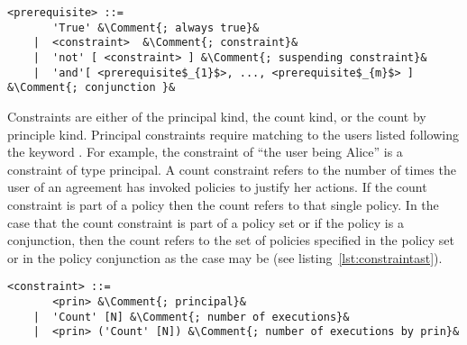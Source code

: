 
\lstset{mathescape, language=AST, escapechar=\&}  
\begin{lstlisting}[frame=single, caption={prerequisite},label={lst:preRequisiteast}]
<prerequisite> ::=  
       'True' &\Comment{; always true}&
    |  <constraint>	 &\Comment{; constraint}&
    |  'not' [ <constraint> ] &\Comment{; suspending constraint}&
    |  'and'[ <prerequisite$_{1}$>, ..., <prerequisite$_{m}$> ] &\Comment{; conjunction }&
\end{lstlisting}

Constraints are either of the principal kind, the count kind, or the count by principle kind. Principal constraints require matching to the users listed following the keyword . For example, the constraint of ``the user being Alice'' is a constraint of type principal. A count constraint refers to the number of times the user of an agreement has invoked policies to justify her actions. If the count constraint is part of a policy then the count refers to that single policy. In the case that the count constraint is part of a policy set or if the policy is a conjunction, then the count refers to the set of policies specified in the policy set or in the policy conjunction as the case may be (see listing~\ref{lst:constraintast}).

\lstset{mathescape, language=AST, escapechar=\&}  
\begin{minipage}[c]{0.95\textwidth}
\begin{lstlisting}[frame=single, caption={constraint},label={lst:constraintast}]
<constraint> ::=  
       <prin> &\Comment{; principal}&
    |  'Count' [N] &\Comment{; number of executions}&
    |  <prin> ('Count' [N]) &\Comment{; number of executions by prin}&
\end{lstlisting}
\end{minipage}